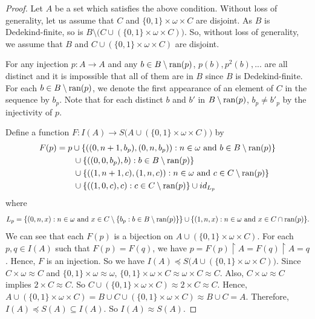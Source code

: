     \begin{proof}
Let $A$ be a set which satisfies the above condition. Without loss of generality, let us assume that $C$ and $\{0,1\}\times\omega\times C$ are disjoint. As $B$ is Dedekind-finite, so is $B\setminus \bigl(C\cup (\{0,1\}\times\omega\times C)\bigr)$. So, without loss of generality, we assume that $B$ and $C\cup (\{0,1\}\times\omega\times C)$ are disjoint.

For any injection $p:A\to A$ and any $b\in B\setminus \textup{ran}(p)$, $p(b),p^{2}(b),...$ are all distinct and it is impossible that all of them are in $B$ since $B$ is Dedekind-finite. For each $b\in B\setminus\textup{ran}(p)$, we denote the first appearance of an element of $C$ in the sequence by $b_{p}$. Note that for each distinct $b$ and $b'$ in $B\setminus \textup{ran}(p)$, $b_{p}\neq b'_{p}$ by the injectivity of $p$. 

Define a function $F:I(A)\to S\bigl(A\cup (\{0,1\}\times\omega\times C)\bigr)$ by 
\begin{align*}
F(p) &= p\cup \{((0,n+1,b_{p}),(0,n,b_{p})):n\in\omega\text{ and }b\in B\setminus \textup{ran}(p)\} \\
& \hspace{2em} \cup\{((0,0,b_{p}),b):b\in B\setminus \textup{ran}(p)\} \\
& \hspace{2em} \cup \{((1,n+1,c),(1,n,c)):n\in\omega\text{ and }c\in C\setminus \textup{ran}(p)\} \\
& \hspace{2em} \cup\{((1,0,c),c):c\in C\setminus \textup{ran}(p)\} \cup id_{L_p}
\end{align*}
where 
\begin{equation*}
L_p=\{(0,n,x):n\in\omega\text{ and } x\in C\setminus\{b_{p}:b\in B\setminus \textup{ran}(p)\}\} \cup \{(1,n,x):n\in\omega\text{ and } x\in C\cap\textup{ran}(p)\}.
\end{equation*}
We can see that each $F(p)$ is a bijection on $A\cup(\{0,1\}\times\omega\times C)$.
For each $p,q\in I(A)$ such that $F(p)=F(q)$, we have $p=F(p)\restriction A =F(q)\restriction A=q$. Hence, $F$ is an injection. So we have $I(A)\preceq S\bigl(A\cup (\{0,1\}\times\omega\times C)\bigr)$. Since $C\times\omega\approx C$ and $\{0,1\}\times\omega \approx \omega$, $\{0,1\}\times\omega\times C \approx \omega\times C \approx C$. Also, $C\times\omega\approx C$ implies $2 \times C \approx C$. So $C \cup (\{0,1\}\times\omega\times C) \approx 2 \times C \approx C$. Hence, $A\cup (\{0,1\}\times\omega\times C) = B\cup C\cup (\{0,1\}\times\omega\times C) \approx B\cup C=A$. Therefore, $I(A)\preceq S(A)\subseteq I(A)$. So $I(A)\approx S(A)$.
\end{proof}

